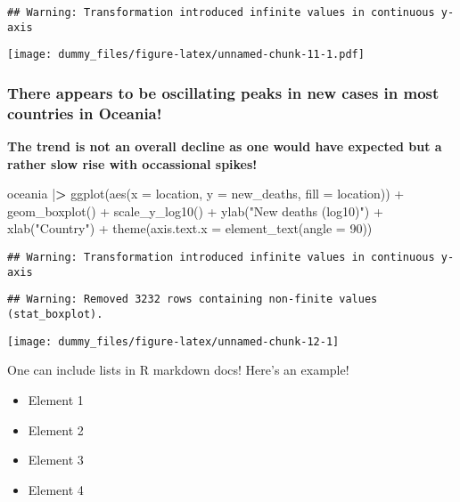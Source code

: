 \documentclass[
]{article}
\newenvironment{Shaded}{\begin{snugshade}}{\end{snugshade}}
\newcommand{\AttributeTok}[1]{\textcolor[rgb]{0.77,0.63,0.00}{#1}}
\newcommand{\DecValTok}[1]{\textcolor[rgb]{0.00,0.00,0.81}{#1}}
\newcommand{\ErrorTok}[1]{\textcolor[rgb]{0.64,0.00,0.00}{\textbf{#1}}}
\newcommand{\FunctionTok}[1]{\textcolor[rgb]{0.00,0.00,0.00}{#1}}
\newcommand{\NormalTok}[1]{#1}
\newcommand{\SpecialCharTok}[1]{\textcolor[rgb]{0.00,0.00,0.00}{#1}}
\newcommand{\StringTok}[1]{\textcolor[rgb]{0.31,0.60,0.02}{#1}}
\providecommand{\tightlist}{%
  \setlength{\itemsep}{0pt}\setlength{\parskip}{0pt}}
\begin{document}
\begin{verbatim}
## Warning: Transformation introduced infinite values in continuous y-axis
\end{verbatim}

\texttt{[image: dummy\_files/figure-latex/unnamed-chunk-11-1.pdf]}

\hypertarget{there-appears-to-be-oscillating-peaks-in-new-cases-in-most-countries-in-oceania}{%
\subsubsection{\texorpdfstring{\textbf{There appears to be oscillating
peaks in new cases in most countries in
Oceania!}}{There appears to be oscillating peaks in new cases in most countries in Oceania!}}\label{there-appears-to-be-oscillating-peaks-in-new-cases-in-most-countries-in-oceania}}

\textbf{The trend is not an overall decline as one would have expected
but a rather slow rise with occassional spikes!}

\begin{Shaded}
\begin{Highlighting}[]
\NormalTok{oceania }\SpecialCharTok{|}\ErrorTok{\textgreater{}} \FunctionTok{ggplot}\NormalTok{(}\FunctionTok{aes}\NormalTok{(}\AttributeTok{x =}\NormalTok{ location, }\AttributeTok{y =}\NormalTok{ new\_deaths, }\AttributeTok{fill =}\NormalTok{ location)) }\SpecialCharTok{+}
    \FunctionTok{geom\_boxplot}\NormalTok{() }\SpecialCharTok{+}
    \FunctionTok{scale\_y\_log10}\NormalTok{() }\SpecialCharTok{+}
    \FunctionTok{ylab}\NormalTok{(}\StringTok{"New deaths (log10)"}\NormalTok{) }\SpecialCharTok{+}
    \FunctionTok{xlab}\NormalTok{(}\StringTok{"Country"}\NormalTok{) }\SpecialCharTok{+}
    \FunctionTok{theme}\NormalTok{(}\AttributeTok{axis.text.x =} \FunctionTok{element\_text}\NormalTok{(}\AttributeTok{angle =} \DecValTok{90}\NormalTok{)) }
\end{Highlighting}
\end{Shaded}

\begin{verbatim}
## Warning: Transformation introduced infinite values in continuous y-axis
\end{verbatim}

\begin{verbatim}
## Warning: Removed 3232 rows containing non-finite values (stat_boxplot).
\end{verbatim}

\begin{center}\texttt{[image: dummy\_files/figure-latex/unnamed-chunk-12-1]} \end{center}

One can include lists in R markdown docs! Here's an example!

\begin{itemize}
\tightlist
\item
  Element 1
\item
  Element 2
\item
  Element 3
\item
  Element 4
\end{itemize}
\end{document}
